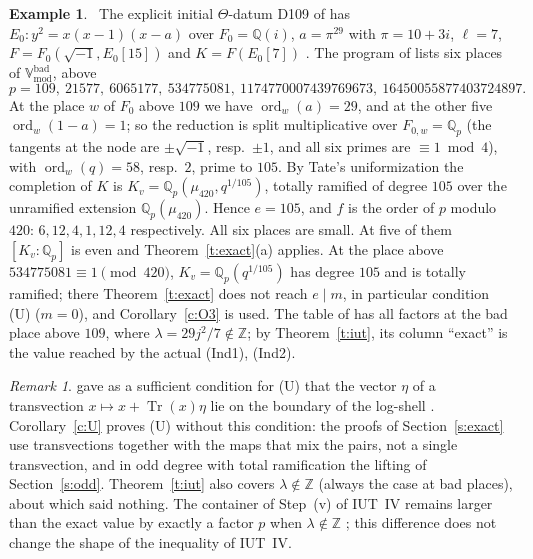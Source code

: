 \documentclass[11pt,a4paper]{article}
\newcommand{\Z}{\mathbb{Z}}
\newcommand{\Q}{\mathbb{Q}}
\newcommand{\Qp}{\mathbb{Q}_p}
\newcommand{\Tr}{\operatorname{Tr}}
\newcommand{\ord}{\operatorname{ord}}
\newcommand{\lab}[2]{{\upshape\fcolorbox{#1}{#1!8}{\scriptsize\sffamily\bfseries\textcolor{#1}{#2}}}}
\newcommand{\tagN}{\lab{BrickRed}{N}}
\theoremstyle{plain}
\theoremstyle{definition}
\newtheorem{example}[theorem]{Example}
\theoremstyle{remark}
\newtheorem{remark}[theorem]{Remark}
\begin{document}
\begin{example}\label{ex:d109}
\tagN\ The explicit initial $\Theta$-datum D109 of \cite{Cat} has $E_0\colon y^2=x(x-1)(x-a)$ over $F_0=\Q(i)$,
$a=\pi^{29}$ with $\pi=10+3i$, $\ell=7$, $F=F_0(\sqrt{-1},E_0[15])$ and $K=F(E_0[7])$ \cite[\S3]{Cat}. The program of
\cite{Walk} lists six places of $\mathbb V^{\mathrm{bad}}_{\mathrm{mod}}$, above
\[
p=109,\ 21577,\ 6065177,\ 534775081,\ 1174770007439769673,\ 16450055877403724897 .
\]
At the place $w$ of $F_0$ above $109$ we have $\ord_w(a)=29$, and at the other five $\ord_w(1-a)=1$; so the reduction
is split multiplicative over $F_{0,w}=\Qp$ (the tangents at the node are $\pm\sqrt{-1}$, resp.\ $\pm1$, and all six
primes are $\equiv1\bmod4$), with $\ord_w(q)=58$, resp.\ $2$, prime to $105$. By Tate's uniformization the completion
of $K$ is $K_v=\Qp(\mu_{420},q^{1/105})$, totally ramified of degree $105$ over the unramified extension
$\Qp(\mu_{420})$. Hence $e=105$, and $f$ is the order of $p$ modulo $420$: $6,12,4,1,12,4$ respectively. All six
places are small. At five of them $[K_v:\Qp]$ is even and Theorem~\ref{t:exact}(a) applies. At the place above
$534775081\equiv1\pmod{420}$, $K_v=\Qp(q^{1/105})$ has degree $105$ and is totally ramified; there
Theorem~\ref{t:exact} does not reach $e\mid m$, in particular condition (U) ($m=0$), and Corollary~\ref{c:O3} is used.
The table of \cite[\S5]{Tiers} has all factors at the bad place above $109$, where $\lambda=29j^2/7\notin\Z$; by
Theorem~\ref{t:iut}, its column ``exact'' is the value reached by the actual (Ind1), (Ind2).
\end{example}

\begin{remark}\label{r:tiers}
\cite{Tiers} gave as a sufficient condition for (U) that the vector $\eta$ of a transvection $x\mapsto x+\Tr(x)\eta$
lie on the boundary of the log-shell \cite[Prop.~4.5]{Tiers}. Corollary~\ref{c:U} proves (U) without this condition:
the proofs of Section~\ref{s:exact} use transvections together with the maps that mix the pairs, not a single
transvection, and in odd degree with total ramification the lifting of Section~\ref{s:odd}. Theorem~\ref{t:iut} also
covers $\lambda\notin\Z$ (always the case at bad places), about which \cite{Tiers} said nothing. The container of
Step~(v) of IUT~IV remains larger than the exact value by exactly a factor $p$ when $\lambda\notin\Z$
\cite[Cor.~3.3]{Tiers}; this difference does not change the shape of the inequality of IUT~IV.
\end{remark}
\end{document}
